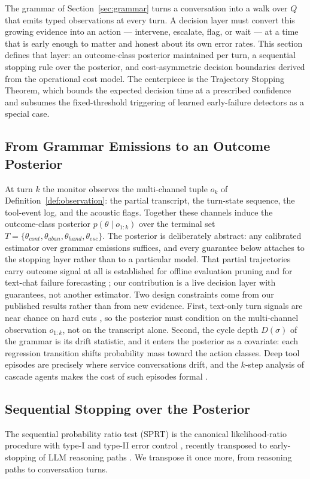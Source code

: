 The grammar of Section~\ref{sec:grammar} turns a conversation into a walk over $Q$ that emits typed observations at every turn.
A decision layer must convert this growing evidence into an action --- intervene, escalate, flag, or wait --- at a time that is early enough to matter and honest about its own error rates.
This section defines that layer: an outcome-class posterior maintained per turn, a sequential stopping rule over the posterior, and cost-asymmetric decision boundaries derived from the operational cost model.
The centerpiece is the Trajectory Stopping Theorem, which bounds the expected decision time at a prescribed confidence and subsumes the fixed-threshold triggering of learned early-failure detectors as a special case.

\subsection{From Grammar Emissions to an Outcome Posterior}
\label{subsec:posterior}
At turn $k$ the monitor observes the multi-channel tuple $o_k$ of Definition~\ref{def:observation}: the partial transcript, the turn-state sequence, the tool-event log, and the acoustic flags.
Together these channels induce the outcome-class posterior $p(\theta \mid o_{1:k})$ over the terminal set $T = \{\theta_{cont}, \theta_{aban}, \theta_{hand}, \theta_{esc}\}$.
The posterior is deliberately abstract: any calibrated estimator over grammar emissions suffices, and every guarantee below attaches to the stopping layer rather than to a particular model.
That partial trajectories carry outcome signal at all is established for offline evaluation pruning \citep{earlyeval2026} and for text-chat failure forecasting \citep{nourbakhsh2026tracer}; our contribution is a live decision layer with guarantees, not another estimator.
Two design constraints come from our published results rather than from new evidence.
First, text-only turn signals are near chance on hard cuts \citep{garcia2026asking}, so the posterior must condition on the multi-channel observation $o_{1:k}$, not on the transcript alone.
Second, the cycle depth $D(\sigma)$ of the grammar is its drift statistic, and it enters the posterior as a covariate: each regression transition shifts probability mass toward the action classes.
Deep tool episodes are precisely where service conversations drift, and the $k$-step analysis of cascade agents makes the cost of such episodes formal \citep{garcia2026latencyfloor}.

\subsection{Sequential Stopping over the Posterior}
\label{subsec:rule}
The sequential probability ratio test (SPRT) is the canonical likelihood-ratio procedure with type-I and type-II error control \citep{wald1947sprt}, recently transposed to early-stopping of LLM reasoning paths \citep{consol2025}.
We transpose it once more, from reasoning paths to conversation turns.

